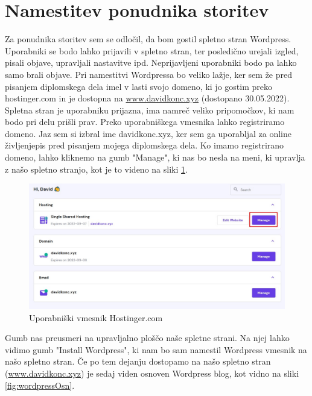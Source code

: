 \documentclass[a4paper,12pt,openright]{book}
\begin{document}
\section{Namestitev ponudnika storitev}

Za ponudnika storitev sem se odločil, da bom gostil spletno stran Wordpress. Uporabniki se bodo lahko prijavili v spletno stran, ter posledično urejali izgled, pisali objave, upravljali nastavitve ipd. 
Neprijavljeni uporabniki bodo pa lahko samo brali objave. 
\newline
Pri namestitvi Wordpressa bo veliko lažje, ker sem že pred pisanjem diplomskega dela imel v lasti svojo domeno, ki jo gostim preko hostinger.com in je dostopna na \href{www.davidkonc.xyz}{www.davidkonc.xyz} (dostopano 30.05.2022). 
\newline
Spletna stran je uporabniku prijazna, ima namreč veliko pripomočkov, ki nam bodo pri delu prišli prav.
Preko uporabniškega vmesnika lahko registriramo domeno. Jaz sem si izbral ime davidkonc.xyz, ker sem ga uporabljal za online življenjepis pred pisanjem mojega diplomskega dela. 
\newline
Ko imamo registrirano domeno, lahko kliknemo na gumb "Manage", ki nas bo nesla na meni, ki upravlja z našo spletno stranjo, kot je to videno na sliki \ref{fig:hostinger}.

\begin{figure}[H]
\hspace{-3,5cm}
\includegraphics[scale=0.65]{diploma-FRI-vzorec_11maj2021/hostinger.jpg}
\caption{Uporabniški vmesnik Hostinger.com}
\label{fig:hostinger}
\end{figure}


Gumb nas preusmeri na upravljalno ploščo naše spletne strani. Na njej lahko vidimo gumb "Install Wordpress", ki nam bo sam namestil Wordpress vmesnik na našo spletno stran. Če po tem dejanju dostopamo na našo spletno stran (\href{www.davidkonc.xyz}{www.davidkonc.xyz}) je sedaj viden osnoven Wordpress blog, kot vidno na sliki \ref{fig:wordpressOsn}.
\end{document}
